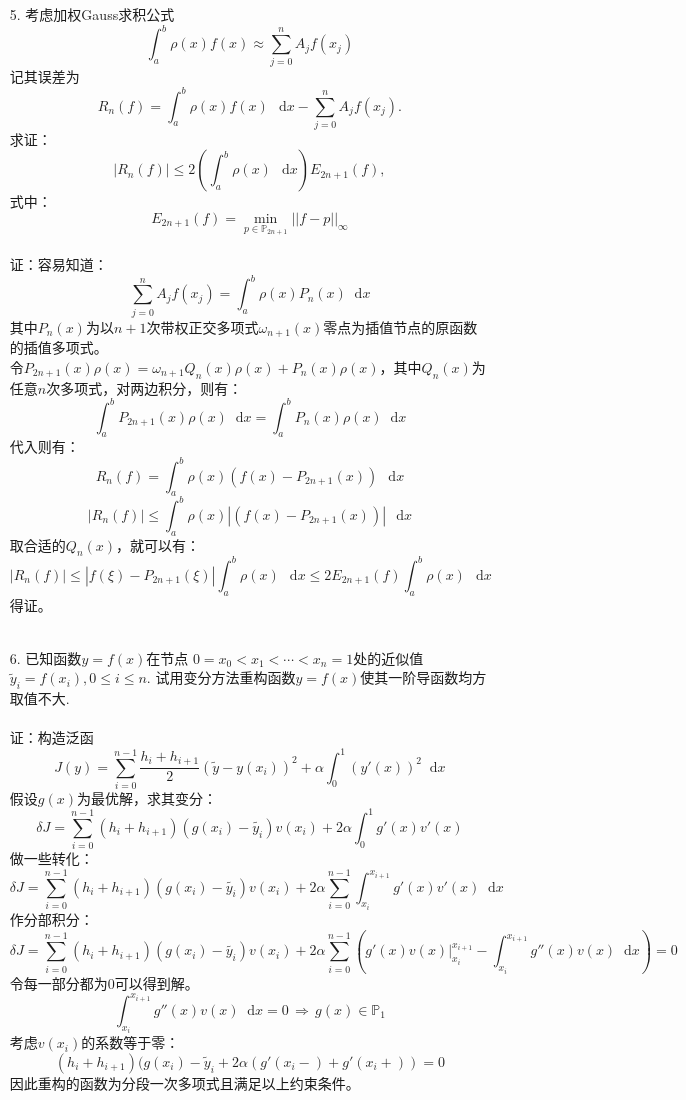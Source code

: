 \documentclass{article}
\newcommand*{\dif}{\mathop{}\!\mathrm{d}}
\begin{document}
\begin{itemize}
		\item[5.]考虑加权Gauss求积公式
		$$\int_{a}^{b}\rho(x)f(x)\approx \sum_{j = 0}^{n}A_jf(x_j)$$
		记其误差为
		$$R_n(f)=\int_{a}^{b}\rho(x)f(x)\,\dif x - \sum_{j = 0}^{n}A_jf(x_j).$$
		求证：
		$$\left|R_n(f)\right| \le 2\left(\int_{a}^{b}\rho(x)\,\dif x\right)E_{2n+1}(f),$$
		式中：
		$$E_{2n+1}(f) =\min_{p\in\mathbb{P}_{2n+1}}||f - p||_{\infty}$$\\
		证：容易知道：
		$$\sum_{j = 0}^{n}A_jf(x_j) = \int_{a}^{b}\rho(x)P_n(x)\dif x$$
		其中$P_n(x)$为以$n+1$次带权正交多项式$\omega_{n+1}(x)$零点为插值节点的原函数的插值多项式。\\
		令$P_{2n+1}(x)\rho(x) = \omega_{n+1}Q_n(x)\rho(x) + P_n(x)\rho(x)$，其中$Q_n(x)$为任意$n$次多项式，对两边积分，则有：
		$$\int_{a}^{b}P_{2n+1}(x)\rho(x)\dif x = \int_{a}^{b}P_n(x)\rho(x) \dif x$$
		代入则有：
		$$
			R_n(f) = \int_{a}^{b}\rho(x)(f(x) - P_{2n+1}(x))\,\dif x
		$$
		$$
			\left|R_n(f)\right| \le \int_{a}^{b}\rho(x)\left|(f(x) - P_{2n+1}(x))\right|\,\dif x
		$$
		取合适的$Q_n(x)$，就可以有：
		$$	\left|R_n(f)\right| \le \left|f(\xi) - P_{2n+1}(\xi)\right| \int_{a}^{b}\rho(x)\,\dif x \le 2E_{2n+1}(f) \int_{a}^{b}\rho(x)\,\dif x $$
		得证。\\\\
		\item[6.]已知函数$y = f(x)$在节点 $0 = x_0 < x_1 < \cdots< x_n = 1 $处的近似值 $\tilde{y}_i = f(x_i),
		0 \le i \le n.$ 试用变分方法重构函数$y = f(x)$使其一阶导函数均方取值不大.\\\\
		证：构造泛函
		$$J(y) = \sum_{i = 0}^{n - 1}\frac{h_i +h_{i+1}}{2}(\tilde{y}-y(x_i))^2 +\alpha\int_{0}^{1}(y'(x))^2\dif x$$
		假设$g(x)$为最优解，求其变分：
		$$\delta J = \sum_{i = 0}^{n - 1}(h_i +h_{i+1})(g(x_i) - \tilde{y_i})v(x_i) + 2\alpha\int_{0}^{1}g'(x)v'(x) $$
		做一些转化：
		$$\delta J = \sum_{i = 0}^{n - 1}(h_i +h_{i+1})(g(x_i) - \tilde{y_i})v(x_i) + 2\alpha\sum_{i = 0}^{n - 1}\int_{x_i}^{x_{i+1}}g'(x)v'(x)\dif x $$
		作分部积分：
		$$\delta J = \sum_{i = 0}^{n - 1}(h_i +h_{i+1})(g(x_i) - \tilde{y_i})v(x_i) + 2\alpha\sum_{i = 0}^{n - 1}\left(\left. g'(x)v(x)\right|^{x_{i+1}}_{x_i} - \int_{x_i}^{x_{i+1}}g''(x)v(x)\dif x\right) = 0$$
		令每一部分都为0可以得到解。
		$$\int_{x_i}^{x_{i+1}}g''(x)v(x)\dif x = 0\, \Rightarrow \, g(x) \in \mathbb{P}_{1}$$
		考虑$v(x_i)$的系数等于零：
		$$(h_i + h_{i+1})(g(x_i) - \tilde{y}_{i} + 2\alpha(g'(x_{i} - )+ g'(x_{i}+)) = 0$$
		因此重构的函数为分段一次多项式且满足以上约束条件。\\\\
		

\end{itemize}
\end{document}
